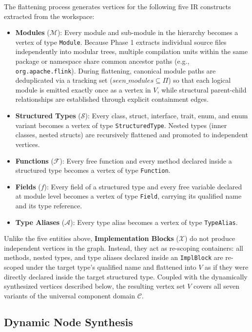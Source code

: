 The flattening process generates vertices for the following five IR
constructs extracted from the workspace:
\begin{itemize}
  \item \textbf{Modules} ($\mathcal{M}$): Every module and sub-module
    in the hierarchy becomes a vertex of type \texttt{Module}. Because
    Phase 1 extracts individual source files independently into modular
    trees, multiple compilation units within the same package or namespace
    share common ancestor paths (e.g.,
    \texttt{org.a}\-\texttt{pache.flink}). During
    flattening, canonical module paths are deduplicated via a tracking set
    ($\textit{seen\_modules} \subseteq \Pi$) so that each logical module is
    emitted exactly once as a vertex in $V$, while structural parent-child
    relationships are established through explicit containment edges.
  \item \textbf{Structured Types} ($\mathcal{S}$): Every class,
    struct, interface, trait, enum, and enum variant becomes a vertex
    of type \texttt{StructuredType}. Nested types (inner classes,
    nested structs) are recursively flattened and promoted to
    independent vertices.
  \item \textbf{Functions} ($\mathcal{F}$): Every free function and
    every method declared inside a structured type becomes a vertex
    of type \texttt{Function}.
  \item \textbf{Fields} ($f$): Every field of a structured type and
    every free variable declared at module level becomes a vertex of
    type \texttt{Field}, carrying its qualified name and its type reference.
  \item \textbf{Type Aliases} ($\mathcal{A}$): Every type alias
    becomes a vertex of type \texttt{TypeAlias}.
\end{itemize}

Unlike the five entities above, \textbf{Implementation Blocks} ($\mathcal{X}$)
do not produce independent vertices in the graph. Instead, they act as
re-scoping containers: all methods, nested types, and type aliases declared
inside an \texttt{ImplBlock} are re-scoped under the target type's qualified
name and flattened into $V$ as if they were directly declared inside the target
structured type. Coupled with the dynamically synthesized vertices
described below,
the resulting vertex set $V$ covers all seven variants of the
universal component
domain $\mathcal{C}$.

\subsection{Dynamic Node Synthesis}

